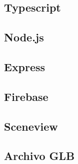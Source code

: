 \subsection{Typescript}

\subsection{Node.js}

\subsection{Express}

\subsection{Firebase}

\subsection{Sceneview}

\subsection{Archivo GLB}

